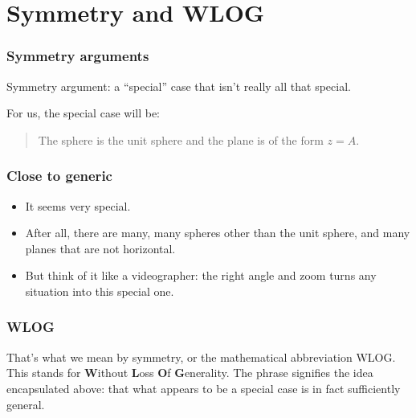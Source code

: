 \documentclass[11pt,ignorenonframetext,aspectratio=169]{beamer}
\begin{document}
\section{Symmetry and WLOG}

\begin{frame}
\frametitle{Symmetry arguments}
Symmetry argument: a ``special'' case that isn't really all that special. 

For us, the special case will be:

\begin{quote}
The sphere is the unit sphere and the plane is of the form $z = A$.
\end{quote}

\end{frame}

\begin{frame}
\frametitle{Close to generic}
\begin{itemize}[<+->]
\item It seems very special.

\item After all, there are many, many spheres other than the unit sphere, and many
planes that are not horizontal.

\item But think of it like a videographer: the right angle and zoom turns any
situation into this special one.
\end{itemize}

\end{frame}

\begin{frame}
\frametitle{WLOG}
That's what we mean by symmetry, or the mathematical abbreviation WLOG.
This stands for \textbf{W}ithout \textbf{L}oss \textbf{O}f
\textbf{G}enerality. The phrase signifies the idea encapsulated above:
that what appears to be a special case is in fact sufficiently general.

\end{frame}
\end{document}
